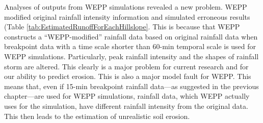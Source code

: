 Analyses of outputs from WEPP simulations revealed a new problem. WEPP modified
original rainfall intensity information and simulated erroneous results
(Table \ref{tab:EstimatedRunoffForEachHillslope}.  This is because that WEPP
constructs a ``WEPP-modified'' rainfall data based on original rainfall data
when breakpoint data with a time scale shorter than 60-min temporal scale is
used for WEPP simulations. Particularly, peak rainfall intensity and the shapes
of rainfall storm are altered. This clearly is a major problem for current
research and for our ability to predict erosion. This is also a major model
fault for WEPP. This means that, even if 15-min breakpoint rainfall data---as
suggested in the previous chapter---are used for WEPP simulations, rainfall
data, which WEPP actually uses for the simulation, have different rainfall
intensity from the original data. This then leads to the estimation of
unrealistic soil erosion.




